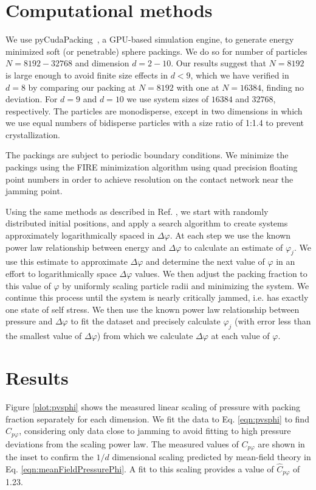 \section{Computational methods}
We use pyCudaPacking~\cite{charbonneau_universal_2012}, a GPU-based simulation engine, to generate energy minimized soft (or penetrable) sphere packings. We do so for number of particles $N=8192-32768$ and dimension $d=2-10$. Our results suggest that $N=8192$ is large enough to avoid finite size effects in $d<9$, which we have verified in $d=8$ by comparing our packing at $N=8192$ with one at $N=16384$, finding no deviation. For $d=9$ and $d=10$ we use system sizes of $16384$ and $32768$, respectively. The particles are monodisperse, except in two dimensions in which we use equal numbers of bidisperse particles with a size ratio of 1:1.4 to prevent crystallization.
 
 The packings are subject to periodic boundary conditions. We minimize the packings using the FIRE minimization algorithm \cite{bitzek_structural_2006} using quad precision floating point numbers in order to achieve resolution on the contact network near the jamming point.
 
 Using the same methods as described in Ref. \cite{charbonneau_jamming_2015}, we start with randomly distributed initial positions, and apply a search algorithm to create systems approximately logarithmically spaced in $\Delta\varphi$. At each step we use the known power law relationship between energy and $\Delta\varphi$ to calculate an estimate of $\varphi_j$. We use this estimate to approximate $\Delta\varphi$ and determine the next value of $\varphi$ in an effort to logarithmically space $\Delta\varphi$ values. We then adjust the packing fraction to this value of $\varphi$ by uniformly scaling particle radii and minimizing the system. We continue this process until the system is nearly critically jammed, i.e. has exactly one state of self stress. We then use the known power law relationship between pressure and $\Delta\varphi$ to fit the dataset and precisely calculate $\varphi_j$ (with error less than the smallest value of $\Delta\varphi$) from which we calculate $\Delta\varphi$ at each value of $\varphi$.
 
 \section{Results}
 Figure \ref{plot:pvsphi} shows the measured linear scaling of pressure with packing fraction separately for each dimension. We fit the data to Eq. \ref{eqn:pvsphi} to find $C_{p\varphi}$, considering only data close to jamming to avoid fitting to high pressure deviations from the scaling power law. The measured values of $C_{p\varphi}$ are shown in the inset to confirm the $1/d$ dimensional scaling predicted by mean-field theory in Eq. \ref{eqn:meanFieldPressurePhi}. A fit to this scaling provides a value of $\hat{C}_{p\varphi}$ of 1.23.


